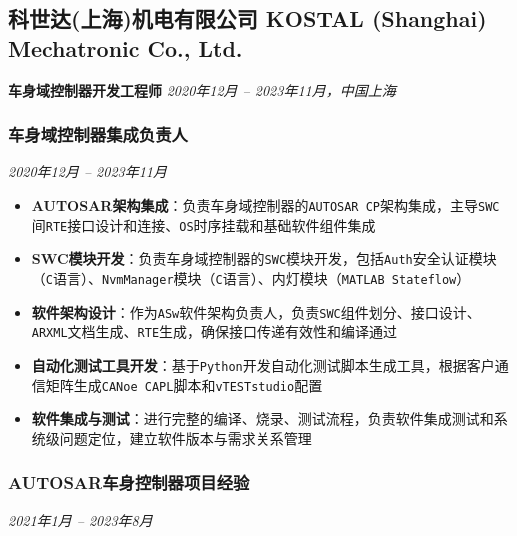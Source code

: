 \documentclass[11pt,a4paper]{ctexart}
\newcommand{\highlight}[1]{\textcolor{primary}{\textbf{#1}}}
\newcommand{\tech}[1]{\textcolor{techblue}{\texttt{#1}}}
\begin{document}
\subsection*{科世达(上海)机电有限公司 KOSTAL (Shanghai) Mechatronic Co., Ltd.}
\textbf{车身域控制器开发工程师} \hfill \textit{2020年12月 -- 2023年11月，中国上海}

\subsubsection*{车身域控制器集成负责人}
\hfill \textit{2020年12月 -- 2023年11月}

\begin{itemize}
  \item[\ding{51}] \highlight{AUTOSAR架构集成}：负责车身域控制器的\tech{AUTOSAR CP}架构集成，主导\tech{SWC}间\tech{RTE}接口设计和连接、\tech{OS}时序挂载和基础软件组件集成
  \item[\ding{51}] \highlight{SWC模块开发}：负责车身域控制器的\tech{SWC}模块开发，包括\tech{Auth}安全认证模块（\tech{C}语言）、\tech{NvmManager}模块（\tech{C}语言）、内灯模块（\tech{MATLAB Stateflow}）
  \item[\ding{51}] \highlight{软件架构设计}：作为\tech{ASw}软件架构负责人，负责\tech{SWC}组件划分、接口设计、\tech{ARXML}文档生成、\tech{RTE}生成，确保接口传递有效性和编译通过
  \item[\ding{51}] \highlight{自动化测试工具开发}：基于\tech{Python}开发自动化测试脚本生成工具，根据客户通信矩阵生成\tech{CANoe CAPL}脚本和\tech{vTESTstudio}配置
  \item[\ding{51}] \highlight{软件集成与测试}：进行完整的编译、烧录、测试流程，负责软件集成测试和系统级问题定位，建立软件版本与需求关系管理
\end{itemize}

\subsubsection*{AUTOSAR车身控制器项目经验}
\hfill \textit{2021年1月 -- 2023年8月}
\end{document}
